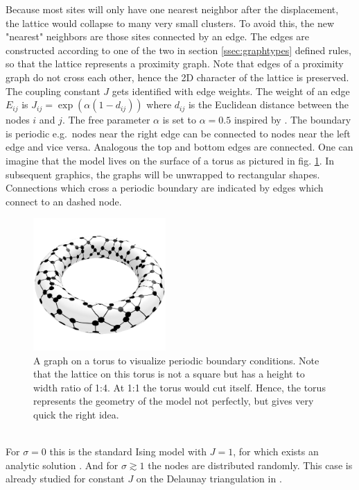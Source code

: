     Because most sites will only have one nearest neighbor after the
    displacement, the lattice would collapse to many very small clusters.
    To avoid this, the new "nearest" neighbors are those sites connected
    by an edge. The edges are constructed according to
    one of the two in section \ref{ssec:graphtypes} defined rules,
    so that the lattice represents a proximity graph. Note that edges
    of a proximity graph do not cross each other, hence the 2D character
    of the lattice is preserved. The coupling constant \(J\) gets
    identified with edge weights. The weight of an edge \(E_{ij}\) is
    \(J_{ij} = \exp (\alpha (1-d_{ij}))\) where \(d_{ij}\) is the Euclidean
    distance between the nodes \(i\) and \(j\). The free parameter
    \(\alpha\) is set to \(\alpha = 0.5\) inspired by \cite{Lima2000}.
    The boundary is periodic e.g.\ nodes near the right edge can be
    connected to nodes near the left edge and vice versa. Analogous the
    top and bottom edges are connected. One can imagine that the model
    lives on the surface of a torus as pictured in fig. \ref{fig:torusRNG}.
    In subsequent graphics, the graphs will be unwrapped to rectangular
    shapes. Connections which cross a periodic boundary are indicated
    by edges which connect to an dashed node.
    \begin{figure}[htbp]
        \centering
        \includegraphics[width=0.45\textwidth]{images/torus}
        \caption[A Graph on a Torus to Visualise Periodic Boundary Conditions]
        {
            A graph on a torus to visualize periodic boundary conditions.
            Note that the lattice on this torus is not a square but has
            a height to width ratio of 1:4. At 1:1 the torus would cut
            itself. Hence, the torus represents the geometry of the model
            not perfectly, but gives very quick the right idea.
        }
        \label{fig:torusRNG}
    \end{figure}\\
    For \(\sigma = 0\) this is the standard Ising model with \(J = 1\),
    for which exists an analytic solution \cite{Onsager1944}. And for
    \(\sigma \gtrsim 1\) the nodes are distributed randomly. This case
    is already studied for constant \(J\) on the Delaunay triangulation
    in \cite{Janke1994}.\\

